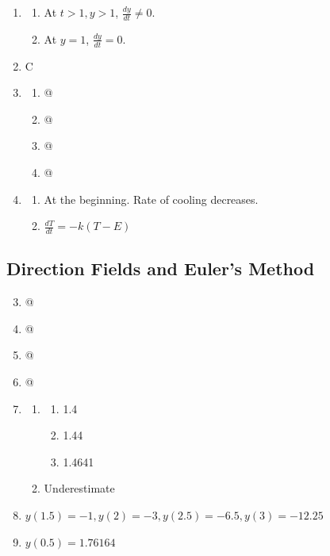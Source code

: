\documentclass{article} \usepackage[margin=1in]{geometry}
\makeatletter
\newcommand*{\rom}[1]{\expandafter\@slowromancap\romannumeral #1@}
\makeatother
\begin{document}
\begin{enumerate}
\begin{enumerate}
		      \item $0,1,a$
		      \item $(-\infty,0)\cup(a, 1)$
		      \item $(0,a)\cup(1,\infty)$
	      \end{enumerate}
	\item \begin{enumerate}
		      \item At $t>1,y>1$, $\frac{dy}{dt}\ne0$.
		      \item At $y=1$, $\frac{dy}{dt}=0$.
	      \end{enumerate}
	\item C
	\item \begin{enumerate}
		      \item \rom{3}
		      \item \rom{1}
		      \item \rom{4}
		      \item \rom{2}
	      \end{enumerate}
	\item \begin{enumerate}
		      \item At the beginning. Rate of cooling decreases.
		      \item $\frac{dT}{dt}=-k(T-E)$
	      \end{enumerate}
\end{enumerate}

\subsection{Direction Fields and Euler's Method}
\begin{enumerate}
	\setcounter{enumi}{2}
	\item \rom{3}
	\item \rom{1}
	\item \rom{4}
	\item \rom{2}
	      \setcounter{enumi}{18}
	\item \begin{enumerate}
		      \item \begin{enumerate}
			            \item 1.4
			            \item 1.44
			            \item 1.4641
		            \end{enumerate}
		      \item Underestimate
	      \end{enumerate}
	      \setcounter{enumi}{20}
	\item $y(1.5)=-1,y(2)=-3,y(2.5)=-6.5,y(3)=-12.25$
	      \setcounter{enumi}{22}
	\item $y(0.5)=1.76164$
\end{enumerate}
\end{document}
